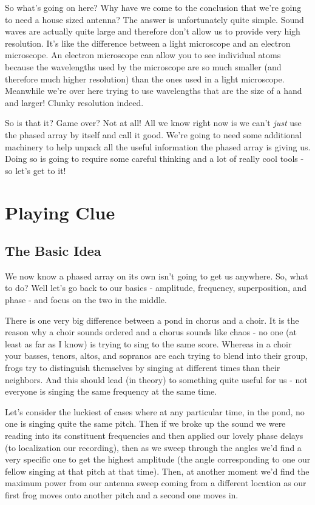 \documentclass[10pt,a4paper]{article}
\begin{document}
So what's going on here? Why have we come to the conclusion that we're going to need a house sized antenna? The answer is unfortunately quite simple. Sound waves are actually quite large and therefore don't allow us to provide very high resolution. It's like the difference between a light microscope and an electron microscope. An electron microscope can allow you to see individual atoms because the wavelengths used by the microscope are so much smaller (and therefore much higher resolution) than the ones used in a light microscope. Meanwhile we're over here trying to use wavelengths that are the size of a hand and larger! Clunky resolution indeed. 

So is that it? Game over? Not at all! All we know right now is we can't \textit{just} use the phased array by itself and call it good. We're going to need some additional machinery to help unpack all the useful information the phased array is giving us. Doing so is going to require some careful thinking and a lot of really cool tools - so let's get to it!

\newpage


\section{Playing Clue}
\subsection{The Basic Idea}
We now know a phased array on its own isn't going to get us anywhere. So, what to do? Well let's go back to our basics - amplitude, frequency, superposition, and phase - and focus on the two in the middle. 

There is one very big difference between a pond in chorus and a choir. It is the reason why a choir sounds ordered and a chorus sounds like chaos - no one (at least as far as I know) is trying to sing to the same score. Whereas in a choir your basses, tenors, altos, and sopranos are each trying to blend into their group, frogs try to distinguish themselves by singing at different times than their neighbors. And this should lead (in theory) to something quite useful for us - not everyone is singing the same frequency at the same time. 

Let's consider the luckiest of cases where at any particular time, in the pond, no one is singing quite the same pitch. Then if we broke up the sound we were reading into its constituent frequencies and then applied our lovely phase delays (to localization our recording), then as we sweep through the angles we'd find a very specific one to get the highest amplitude (the angle corresponding to one our fellow singing at that pitch at that time). Then, at another moment we'd find the maximum power from our antenna sweep coming from a different location as our first frog moves onto another pitch and a second one moves in. 
\end{document}
